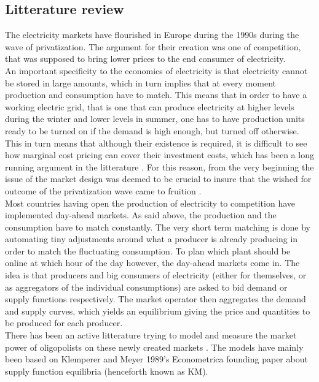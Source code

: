 \subsection{Litterature review}
The electricity markets have flourished in Europe during the 1990s during the wave of privatization. The argument for their creation was one of competition, that was supposed to bring lower prices to the end consumer of electricity.\\

An important specificity to the economics of electricity is that electricity cannot be stored in large amounts, which in turn implies that at every moment production and consumption have to match. This means that in order to have a working electric grid, that is one that can produce electricity at higher levels during the winter and lower levels in summer, one has to have production units ready to be turned on if the demand is high enough, but turned off otherwise. This in turn means that although their existence is required, it is difficult to see how marginal cost pricing can cover their investment costs, which has been a long running argument in the litterature \cite{boiteux1960peak}. For this reason, from the very beginning the issue of the market design was deemed to be crucial to insure that the wished for outcome of the privatization wave came to fruition \cite{green1991reshaping}. \\

Most countries having open the production of electricity to competition have implemented day-ahead markets. As said above, the production and the consumption have to match constantly. The very short term matching is done by automating tiny adjustments around what a producer is already producing in order to match the fluctuating consumption. To plan which plant should be online at which hour of the day however, the day-ahead markets come in. The idea is that producers and big consumers of electricity (either for themselves, or as aggregators of the individual consumptions) are asked to bid demand or supply functions respectively. The market operator then aggregates the demand and supply curves, which yields an equilibrium giving the price and quantities to be produced for each producer.  \\

There has been an active litterature trying to model and measure the market power of oligopolists on these newly created markets \cite{Newgreen, newbery1998competition, green1999electricity}. The models have mainly been based on Klemperer and Meyer 1989's Econometrica founding paper about supply function equilibria \cite{KM} (henceforth known as KM). \\

